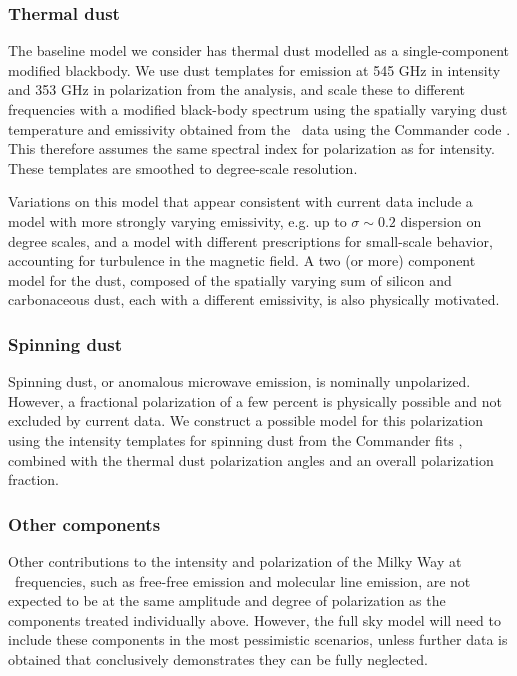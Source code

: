 \subsubsection{Thermal dust}
The baseline model we consider has thermal dust modelled as a single-component modified  blackbody. We use dust templates for emission at 545 GHz in intensity and 
 353 GHz in polarization from the  analysis, and scale these to different  frequencies with a modified black-body spectrum using the spatially varying dust temperature and emissivity obtained from the \planck\ data using the Commander code \cite{Adam:2015wua}. This therefore assumes the same spectral index for  polarization as for intensity.  These templates are smoothed to degree-scale resolution.

Variations on this model that appear consistent with current data include a model with more strongly varying emissivity, e.g. up to $\sigma \sim 0.2$ dispersion on degree scales, and a model with different prescriptions for small-scale behavior, accounting for turbulence in the magnetic field. A two (or more) component model for the dust, composed of the spatially varying sum of silicon and carbonaceous dust, each with a different emissivity, is also physically motivated.

\subsubsection{Spinning dust}
Spinning dust, or anomalous microwave emission, is nominally unpolarized. However, a fractional polarization of a few percent is physically possible and not excluded by current data. We construct a possible model for this polarization using the intensity templates for spinning dust from the  Commander fits
\cite{Adam:2015wua}, combined with the thermal dust polarization angles and an overall polarization fraction.



\subsubsection{Other components}
Other contributions to the intensity and polarization of the Milky Way at \cmbexp\ frequencies, such as 
free-free emission and molecular line emission, are not expected to be at the same amplitude and degree
of polarization as the components treated individually above. However, the full sky model will need to include
these components in the most pessimistic scenarios, unless further data is obtained that 
conclusively demonstrates they can be fully neglected.

